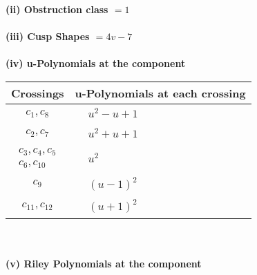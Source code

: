 \documentclass[1p]{elsarticle_modified}
\theoremstyle{definition}
\begin{document}
\flushleft \textbf{(ii) Obstruction class $= 1$}\\~\\
\flushleft \textbf{(iii) Cusp Shapes $= 4 v-7$}\\~\\
\newpage\renewcommand{\arraystretch}{1}
\flushleft \textbf{(iv) u-Polynomials at the component}\newline \\
\begin{tabular}{m{50pt}|m{274pt}}
Crossings & \hspace{64pt}u-Polynomials at each crossing \\
\hline $$\begin{aligned}c_{1},c_{8}\end{aligned}$$&$\begin{aligned}
&u^2- u+1
\end{aligned}$\\
\hline $$\begin{aligned}c_{2},c_{7}\end{aligned}$$&$\begin{aligned}
&u^2+u+1
\end{aligned}$\\
\hline $$\begin{aligned}c_{3},c_{4},c_{5}\\c_{6},c_{10}\end{aligned}$$&$\begin{aligned}
&u^2
\end{aligned}$\\
\hline $$\begin{aligned}c_{9}\end{aligned}$$&$\begin{aligned}
&(u-1)^2
\end{aligned}$\\
\hline $$\begin{aligned}c_{11},c_{12}\end{aligned}$$&$\begin{aligned}
&(u+1)^2
\end{aligned}$\\
\hline
\end{tabular}\\~\\
\newpage\renewcommand{\arraystretch}{1}
\flushleft \textbf{(v) Riley Polynomials at the component}\newline \\
\end{document}

